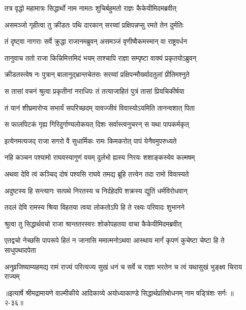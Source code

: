 \twolineshloka
{तत्र वृद्धो महामात्रः सिद्धार्थो नाम नामतः}
{शुचिर्बहुमतो राज्ञः कैकेयीमिदमब्रवीत्} %

\twolineshloka
{असमञ्जो गृहीत्वा तु क्रीडतः पथि दारकान्}
{सरय्वां प्रक्षिपन्नप्सु रमते तेन दुर्मतिः} %

\twolineshloka
{तं दृष्ट्वा नागराः सर्वे क्रुद्धा राजानमब्रुवन्}
{असमञ्जं वृणीष्वैकमस्मान् वा राष्ट्रवर्धन} %

\twolineshloka
{तानुवाच ततो राजा किन्निमित्तमिदं भयम्}
{ताश्चापि राज्ञा सम्पृष्टा वाक्यं प्रकृतयोऽब्रुवन्} %

\twolineshloka
{क्रीडतस्त्वेष नः पुत्रान् बालानुद्भ्रान्तचेतसः}
{सरय्वां प्रक्षिपन्मौर्ख्यादतुलां प्रीतिमश्नुते} %

\twolineshloka
{स तासां वचनं श्रुत्वा प्रकृतीनां नराधिपः}
{तं तत्याजाहितं पुत्रं तासां प्रियचिकीर्षया} %

\twolineshloka
{तं यानं शीघ्रमारोप्य सभार्यं सपरिच्छदम्}
{यावज्जीवं विवास्योऽयमिति तानन्वशात् पिता} %

\twolineshloka
{स फालपिटकं गृह्य गिरिदुर्गाण्यलोकयत्}
{दिशः सर्वास्त्वनुचरन् स यथा पापकर्मकृत्} %

\twolineshloka
{इत्येनमत्यजद् राजा सगरो वै सुधार्मिकः}
{रामः किमकरोत् पापं येनैवमुपरुध्यते} %

\twolineshloka
{नहि कञ्चन पश्यामो राघवस्यागुणं वयम्}
{दुर्लभो ह्यस्य निरयः शशाङ्कस्येव कल्मषम्} %

\twolineshloka
{अथवा देवि त्वं कञ्चिद् दोषं पश्यसि राघवे}
{तमद्य ब्रूहि तत्त्वेन तदा रामो विवास्यते} %

\twolineshloka
{अदुष्टस्य हि सन्त्यागः सत्पथे निरतस्य च}
{निर्दहेदपि शक्रस्य द्युतिं धर्मविरोधवान्} %

\twolineshloka
{तदलं देवि रामस्य श्रिया विहतया त्वया}
{लोकतोऽपि हि ते रक्ष्यः परिवादः शुभानने} %

\twolineshloka
{श्रुत्वा तु सिद्धार्थवचो राजा श्रान्ततरस्वरः}
{शोकोपहतया वाचा कैकेयीमिदमब्रवीत्} %

\twolineshloka
{एतद्वचो नेच्छसि पापरूपे हितं न जानासि ममात्मनोऽथवा}
{आस्थाय मार्गं कृपणं कुचेष्टा चेष्टा हि ते साधुपथादपेता} %

\twolineshloka
{अनुव्रजिष्याम्यहमद्य रामं राज्यं परित्यज्य सुखं धनं च}
{सर्वे च राज्ञा भरतेन च त्वं यथासुखं भुङ्क्ष्व चिराय राज्यम्} %


॥इत्यार्षे श्रीमद्रामायणे वाल्मीकीये आदिकाव्ये अयोध्याकाण्डे सिद्धार्थप्रतिबोधनम् नाम षड्त्रिंशः सर्गः ॥२-३६॥

